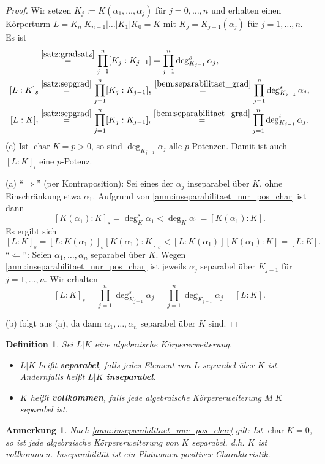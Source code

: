 \documentclass[a4paper, twoside, 11pt, ngerman]{report}
\DeclareMathOperator{\charact}{char}
\theoremstyle{definistyle}
\newtheorem{defini}[satz]{Definition}
\newtheorem{anm}[satz]{Anmerkung}
\theoremstyle{remark}
\newcommand{\defn}[1]{\textit{\bfseries #1}}
\begin{document}
\begin{proof}
Wir setzen $K_j := K(\alpha_1, \dots, \alpha_j)$ für $j = 0, \dots, n$ und erhalten einen Körperturm $L=K_n|K_{n-1}|\ldots|K_1|K_0=K$ mit $K_j=K_{j-1}(\alpha_j)$ für $j=1,\ldots,n$. Es ist
\begin{align*}
[L : K] & \overset{\ref{satz:gradsatz}}{=} \prod_{j=1}^n [K_j : K_{j-1}] = \prod_{j=1}^n \deg^s_{K_{j-1}} \alpha_j, \\
[L : K]_s & \overset{\ref{satz:sepgrad}}{=} \prod_{j=1}^n [K_j : K_{j-1}]_s \overset{\ref{bem:separabilitaet_grad}}{=} \prod_{j=1}^n \deg^s_{K_{j-1}} \alpha_j,\\
[L : K]_i & \overset{\ref{satz:sepgrad}}{=} \prod_{j=1}^n [K_j : K_{j-1}]_i \overset{\ref{bem:separabilitaet_grad}}{=} \prod_{j=1}^n \deg^i_{K_{j-1}} \alpha_j.
\end{align*}
(c) Ist $\charact K = p > 0$, so sind $\deg_{K_{j-1}} \alpha_j$ alle $p$-Potenzen. Damit ist auch $[L : K]_i$ eine $p$-Potenz.

(a) "`$\Rightarrow$"' (per Kontraposition): Sei eines der $\alpha_j$ inseparabel über $K$, ohne Einschränkung etwa $\alpha_1$. Aufgrund von \ref{anm:inseparabilitaet_nur_pos_char} ist dann
\[
[K(\alpha_1):K]_s=\deg_K^s\alpha_1<\deg_K\alpha_1=[K(\alpha_1):K].
\]
Es ergibt sich
\[
[L : K]_s = [L : K(\alpha_1)]_s[K(\alpha_1) : K]_s < [L : K(\alpha_1)][K(\alpha_1) : K] = [L:K].
\]
"`$\Leftarrow$"': Seien $\alpha_1, \dots, \alpha_n$ separabel über $K$. Wegen \ref{anm:inseparabilitaet_nur_pos_char} 
ist jeweils $\alpha_j$ separabel über $K_{j-1}$ für $j=1,\ldots,n$. Wir erhalten 
\[
[L : K]_s = \prod_{j=1}^n \deg^s_{K_{j-1}} \alpha_j = \prod_{j=1}^n \deg_{K_{j-1}} \alpha_j = [L:K].
\]

(b) folgt aus (a), da dann $\alpha_1,\ldots,\alpha_n$ separabel über $K$ sind.
\end{proof}

\begin{defini}\label{def:separabel_vollkommen}
Sei $L|K$ eine algebraische Körpererweiterung.
\begin{itemize}
    \item $L|K$ heißt \defn{separabel}, falls jedes Element von $L$ separabel über $K$ ist. Andernfalls heißt $L|K$ \defn{inseparabel}.
    \item $K$ heißt \defn{vollkommen}, falls jede algebraische Körpererweiterung $M|K$ separabel ist.
\end{itemize}
\end{defini}

\begin{anm}\label{anm:vollkommenheit_charakteristik}
Nach \ref{anm:inseparabilitaet_nur_pos_char} gilt: Ist $\charact K = 0$, so ist jede algebraische Körpererweiterung von $K$ separabel, d.h. $K$ ist vollkommen. Inseparabilität ist ein Phänomen positiver Charakteristik.
\end{anm}
\end{document}
